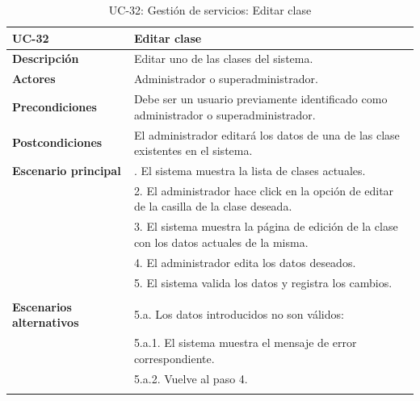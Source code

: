 \begin{table}
  \begin{center}
    \begin{tabularx}{16.4cm}{|l|X|}
      \hline
      \textbf{UC-32} & \textbf{Editar clase}\\
      \hline
      \textbf{Descripción} & Editar uno de las clases del sistema.\\
      \hline
      \textbf{Actores} & Administrador o superadministrador.\\
      \hline
      \textbf{Precondiciones} & Debe ser un usuario previamente identificado como administrador o superadministrador.\\
      \hline
      \textbf{Postcondiciones} & El administrador editará los datos de una de las clase existentes en el sistema.\\
      \hline
      \textbf{Escenario principal} & \smallskip 1. El sistema muestra la lista de clases actuales.\\
      & 2. El administrador hace click en la opción de editar de la casilla de la clase deseada.\\
      & 3. El sistema muestra la página de edición de la clase con los datos actuales de la misma.\\
      & 4. El administrador edita los datos deseados.\\
      & 5. El sistema valida los datos y registra los cambios.\\
      & \\
      \hline
      \textbf{Escenarios alternativos} & \smallskip 5.a. Los datos introducidos no son válidos:\\
      & \hspace{0.3cm} 5.a.1. El sistema muestra el mensaje de error correspondiente.\\
      & \hspace{0.3cm} 5.a.2. Vuelve al paso 4.\\
      & \\
      \hline
    \end{tabularx}
    \caption{UC-32: Gestión de servicios: Editar clase}
    \label{tab:CU-editar-clase}
  \end{center}
\end{table}


